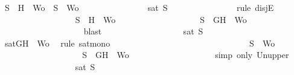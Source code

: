 \begin{isabellebody}
\ {\isachardoublequoteopen}S{\isacharprime}\ {\isacharequal}\ {\isacharbraceleft}H{\isacharbraceright}\ {\isasymunion}\ Wo{\isacharprime}\ {\isasymor}\ S{\isacharprime}\ {\isacharequal}\ Wo{\isacharprime}{\isachardoublequoteclose}\isanewline
\ \ \ \ \ \ \ \ \ \ \ \ \ \ \isamarkupfalse%
\ {\isachardoublequoteopen}sat\ S{\isacharprime}{\isachardoublequoteclose}\isanewline
\ \ \ \ \ \ \ \ \ \ \ \ \ \ \isamarkupfalse%
\ {\isacharparenleft}rule\ disjE{\isacharparenright}\isanewline
\ \ \ \ \ \ \ \ \ \ \ \ \ \ \ \ \isamarkupfalse%
\ {\isachardoublequoteopen}S{\isacharprime}\ {\isacharequal}\ {\isacharbraceleft}H{\isacharbraceright}\ {\isasymunion}\ Wo{\isacharprime}{\isachardoublequoteclose}\isanewline
\ \ \ \ \ \ \ \ \ \ \ \ \ \ \ \ \isamarkupfalse%
\ \isamarkupfalse%
\ {\isachardoublequoteopen}S{\isacharprime}\ {\isasymsubseteq}\ {\isacharbraceleft}G{\isacharcomma}H{\isacharbraceright}\ {\isasymunion}\ Wo{\isacharprime}{\isachardoublequoteclose}\isanewline
\ \ \ \ \ \ \ \ \ \ \ \ \ \ \ \ \ \ \isamarkupfalse%
\ blast\ \isanewline
\ \ \ \ \ \ \ \ \ \ \ \ \ \ \ \ \isamarkupfalse%
\ {\isachardoublequoteopen}sat\ S{\isacharprime}{\isachardoublequoteclose}\isanewline
\ \ \ \ \ \ \ \ \ \ \ \ \ \ \ \ \ \ \isamarkupfalse%
\ {\isacartoucheopen}sat{\isacharparenleft}{\isacharbraceleft}G{\isacharcomma}H{\isacharbraceright}\ {\isasymunion}\ Wo{\isacharprime}{\isacharparenright}{\isacartoucheclose}\ \isamarkupfalse%
\ {\isacharparenleft}rule\ sat{\isacharunderscore}mono{\isacharparenright}\isanewline
\ \ \ \ \ \ \ \ \ \ \ \ \ \ \isamarkupfalse%
\isanewline
\ \ \ \ \ \ \ \ \ \ \ \ \ \ \ \ \isamarkupfalse%
\ {\isachardoublequoteopen}S{\isacharprime}\ {\isacharequal}\ Wo{\isacharprime}{\isachardoublequoteclose}\isanewline
\ \ \ \ \ \ \ \ \ \ \ \ \ \ \ \ \isamarkupfalse%
\ \isamarkupfalse%
\ {\isachardoublequoteopen}S{\isacharprime}\ {\isasymsubseteq}\ {\isacharbraceleft}G{\isacharcomma}H{\isacharbraceright}\ {\isasymunion}\ Wo{\isacharprime}{\isachardoublequoteclose}\isanewline
\ \ \ \ \ \ \ \ \ \ \ \ \ \ \ \ \ \ \isamarkupfalse%
\ {\isacharparenleft}simp\ only{\isacharcolon}\ Un{\isacharunderscore}upper{}{\isacharparenright}\isanewline
\ \ \ \ \ \ \ \ \ \ \ \ \ \ \ \ \isamarkupfalse%
\ {\isachardoublequoteopen}sat\ S{\isacharprime}{\isachardoublequoteclose}\isanewline
\ \ \ \ \ \ \ \ \ \ \ \ \ \ \ \ \ \ \isamarkupfalse%

\end{isabellebody}
